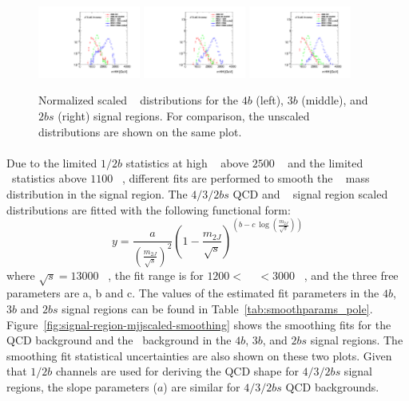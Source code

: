 \begin{figure}[htb!]
\begin{center}
\includegraphics[width=0.3\textwidth,angle=-90]{figures/boosted/Other/FourTag_Signal_compare_scale_mHH_1.pdf}
\includegraphics[width=0.3\textwidth,angle=-90]{figures/boosted/Other/ThreeTag_Signal_compare_scale_mHH_1.pdf}
\includegraphics[width=0.3\textwidth,angle=-90]{figures/boosted/Other/TwoTag_split_Signal_compare_scale_mHH_1.pdf}
\caption{Normalized scaled \mtwoJ~ distributions for the $4b$ (left), $3b$ (middle), and $2bs$ (right) signal regions. For comparison, the unscaled  \mtwoJ~ distributions are shown on the same plot. }
\label{fig:signal-region-bkg-scaled}
\end{center}
\end{figure}

\paragraph{} 
Due to the limited $1/2b$ statistics at high \mtwoJ~ above $2500$ \GeV~ and the limited \ttbar\ statistics above $1100$ \GeV~, different fits are performed to smooth the \mtwoJ~ mass distribution in the signal region. 
The $4/3/2bs$ QCD and \ttbar~ signal region scaled \mtwoJ~ distributions are fitted with the following functional form:
\begin{equation}
\label{eq:boosted_dijet}
y = \frac{a}{(\frac{m_{2J}}{\sqrt{s}})^2} (1-\frac{m_{2J}}{\sqrt{s}})^{(b - c\ \log(\frac{m_{2J}}{\sqrt{s}}))}
\end{equation}
where $\sqrt{s} = 13000$ \GeV~, the fit range is for $1200 <$ \mtwoJ~ $< 3000$ \GeV~, and the three free parameters are a, b and c.
The values of the estimated fit parameters in the $4b$, $3b$ and $2bs$ signal regions can be found in Table~\ref{tab:smoothparams_pole}.
Figure~\ref{fig:signal-region-mjjscaled-smoothing} shows the smoothing fits for the QCD background and the \ttbar\ background in the $4b$, $3b$, and $2bs$ signal regions.
The smoothing fit statistical uncertainties are also shown on these two plots. 
Given that $1/2b$ channels are used for deriving the QCD shape for $4/3/2bs$ signal regions, the slope parameters ($a$) are similar for $4/3/2bs$ QCD backgrounds.

